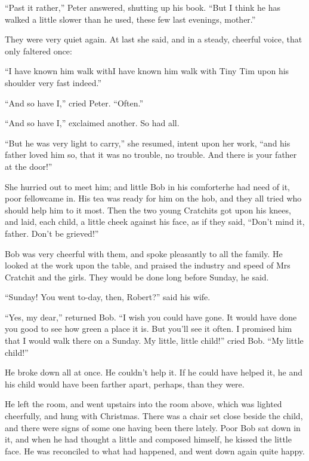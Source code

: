 \documentclass[paper=5.5in:8.5in,BCOR=10mm,twoside,DIV=15,12pt,usegeometry,openany]{scrbook} %
\begin{document}
\enquote{Past it rather,} Peter answered, shutting up his book. \enquote{But I think he has walked a little slower than he used, these few last evenings, mother.}

They were very quiet again. At last she said, and in a steady, cheerful voice, that only faltered once:

\enquote{I have known him walk with\textemdash I have known him walk with Tiny Tim upon his shoulder very fast indeed.}

\enquote{And so have I,} cried Peter. \enquote{Often.}

\enquote{And so have I,} exclaimed another. So had all.

\enquote{But he was very light to carry,} she resumed, intent upon her work, \enquote{and his father loved him so, that it was no trouble, no trouble. And there is your father at the door!}

She hurried out to meet him; and little Bob in his comforter\textemdash he had need of it, poor fellow\textemdash came in. His tea was ready for him on the hob, and they all tried who should help him to it most. Then the two young Cratchits got upon his knees, and laid, each child, a little cheek against his face, as if they said, \enquote{Don't mind it, father. Don't be grieved!}

Bob was very cheerful with them, and spoke pleasantly to all the family. He looked at the work upon the table, and praised the industry and speed of Mrs Cratchit and the girls. They would be done long before Sunday, he said.

\enquote{Sunday! You went to-day, then, Robert?} said his wife.

\enquote{Yes, my dear,} returned Bob. \enquote{I wish you could have gone. It would have done you good to see how green a place it is. But you'll see it often. I promised him that I would walk there on a Sunday. My little, little child!} cried Bob. \enquote{My little child!}

He broke down all at once. He couldn't help it. If he could have helped it, he and his child would have been farther apart, perhaps, than they were.

He left the room, and went upstairs into the room above, which was lighted cheerfully, and hung with Christmas. There was a chair set close beside the child, and there were signs of some one having been there lately. Poor Bob sat down in it, and when he had thought a little and composed himself, he kissed the little face. He was reconciled to what had happened, and went down again quite happy.
\end{document}
